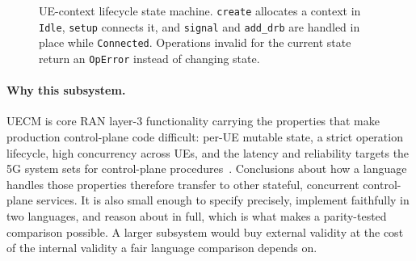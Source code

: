 \documentclass[english,oneside,a4paper,censored,csm,software-track-2020]{HYthesisML}
\begin{document}
\begin{figure}[ht]
\centering
{}
\caption[UE-context lifecycle state machine]{UE-context lifecycle state machine. \texttt{create} allocates a context in
\texttt{Idle}, \texttt{setup} connects it, and \texttt{signal} and \texttt{add\_drb} are handled
in place while \texttt{Connected}. Operations invalid for the current state return an
\texttt{OpError} instead of changing state.\label{fig:fsm}}
\end{figure}

\paragraph{Why this subsystem.}
UECM is core RAN layer-3 functionality carrying the properties that make production
control-plane code difficult: per-UE mutable state, a strict operation lifecycle, high
concurrency across UEs, and the latency and reliability targets the 5G system sets for
control-plane procedures~\cite{3gpp38913,3gpp22261}. Conclusions about how a language handles
those properties therefore transfer to other stateful, concurrent control-plane services. It is
also small enough to specify precisely, implement faithfully in two languages, and reason about
in full, which is what makes a parity-tested comparison possible. A larger subsystem would buy
external validity at the cost of the internal validity a fair language comparison depends on.
\end{document}
